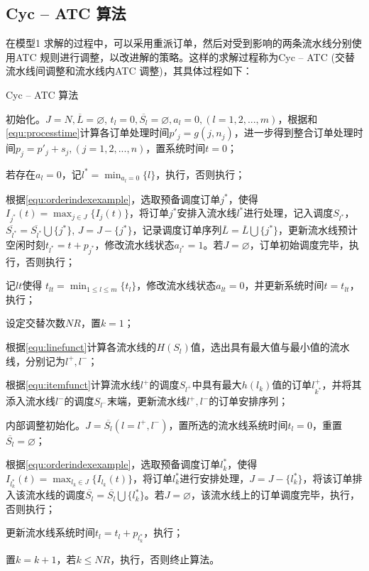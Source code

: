 \subsection{Cyc -- ATC 算法}
在模型1 求解的过程中，可以采用重派订单，然后对受到影响的两条流水线分别使用ATC 规则进行调整，以改进解的策略。这样的求解过程称为Cyc -- ATC (交替流水线间调整和流水线内ATC 调整)，其具体过程如下：
\begin{algori}
Cyc -- ATC 算法
\begin{asparaenum}
\renewcommand{\labelenumi}{\bf Step\theenumi~}
\item 初始化。$J = N, \overline{L} = \varnothing$, $t_l = 0, \overline{S_l} = \varnothing, a_l=0, (l = 1,2,...,m)$，根据和\eqref{equ:processtime}计算各订单处理时间$p'_j = g(j, n_j)$，进一步得到整合订单处理时间$p_j = p'_j + s_j, (j = 1,2,...,n)$，置系统时间$t = 0$；
\item 若存在$a_l = 0$，记$l^* = \displaystyle\min_{a_l = 0}\{l\}$，执行，否则执行；
\item 根据\eqref{equ:orderindexexample}，选取预备调度订单$j^*$，使得$I_{j^*}(t) = \displaystyle\max_{j\in J}\{I_j(t)\}$，将订单$j^*$安排入流水线$l^*$进行处理，记入调度$S_{l^*}$，$\overline{S_{l^*}}=\overline{S_{l^*}}\bigcup \{j^*\}$, $J = J -\{j^*\}$，记录调度订单序列$\overline{L} = \overline{L} \bigcup \{j^*\}$，更新流水线预计空闲时刻$t_{l^*} = t + p_{j^*}$，修改流水线状态$a_{l^*} = 1$。若$J = \varnothing$，订单初始调度完毕，执行，否则执行；
\item 记$lt$使得 $t_{lt} = \displaystyle\min_{1\le l\le m}\{t_l\}$，修改流水线状态$a_{lt} = 0$，并更新系统时间$t = t_{lt}$，执行；
\item 设定交替次数$NR$，置$k = 1$；
\item 根据\eqref{equ:linefunct}计算各流水线的$H(S_l)$值，选出具有最大值与最小值的流水线，分别记为$l^+, l^-$；
\item 根据\eqref{equ:itemfunct}计算流水线$l^+$的调度$S_{l^+}$中具有最大$h(l_k)$值的订单$l^+_{k^*}$，并将其添入流水线$l^-$的调度$S_{l^-}$末端，更新流水线$l^+, l^-$的订单安排序列；
\item 内部调整初始化。$J = \overline{S_l}(l = l^+, l^-)$，置所选的流水线系统时间$t_l = 0$，重置$\overline{S_l} = \varnothing$；
\item 根据\eqref{equ:orderindexexample}，选取预备调度订单$l_k^*$，使得$I_{l_k^*}(t) = \displaystyle\max_{l_k\in J}\{I_{l_k}(t)\}$，将订单$l_k^*$进行安排处理，$J = J -\{l_k^*\}$，将该订单排入该流水线的调度$\overline{S_l} = \overline{S_l}\bigcup \{l_k^*\} $。若$J = \varnothing$，该流水线上的订单调度完毕，执行，否则执行；
\item 更新流水线系统时间$t_l = t_l + p_{l_k^*}$，执行；
\item 置$k = k+1$，若$k\le NR$，执行，否则终止算法。
\end{asparaenum}
\end{algori}

